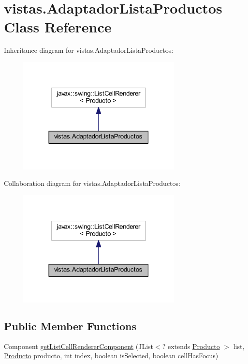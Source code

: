 \hypertarget{classvistas_1_1_adaptador_lista_productos}{}\section{vistas.\+Adaptador\+Lista\+Productos Class Reference}
\label{classvistas_1_1_adaptador_lista_productos}


Inheritance diagram for vistas.\+Adaptador\+Lista\+Productos\+:
\nopagebreak
\begin{figure}[H]
\begin{center}
\leavevmode
\includegraphics[width=234pt]{classvistas_1_1_adaptador_lista_productos__inherit__graph}
\end{center}
\end{figure}


Collaboration diagram for vistas.\+Adaptador\+Lista\+Productos\+:
\nopagebreak
\begin{figure}[H]
\begin{center}
\leavevmode
\includegraphics[width=234pt]{classvistas_1_1_adaptador_lista_productos__coll__graph}
\end{center}
\end{figure}
\subsection*{Public Member Functions}
\begin{DoxyCompactItemize}
\item 
Component \mbox{\hyperlink{classvistas_1_1_adaptador_lista_productos_a11ec1a4af03c0af6d15446b47338dd9d}{get\+List\+Cell\+Renderer\+Component}} (J\+List$<$? extends \mbox{\hyperlink{class_productos_1_1_producto}{Producto}} $>$ list, \mbox{\hyperlink{class_productos_1_1_producto}{Producto}} producto, int index, boolean is\+Selected, boolean cell\+Has\+Focus)
\end{DoxyCompactItemize}


